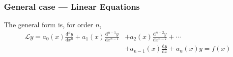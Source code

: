 \documentclass[12pt]{report}
\theoremstyle{definition}
\begin{document}
\subsubsection{General case --- Linear Equations}

The general form is, for order $n$,
\begin{equation}
    \begin{align}\label{ODE:7}
    \mathscr{L} y = a_0(x)\frac{\mathrm{d}^{n}y}{\mathrm{d}x^{n}} + a_1(x)\frac{\mathrm{d}^{n-1}y}{\mathrm{d}x^{n-1}}
    & + a_2(x)\frac{\mathrm{d}^{n-2}y}{\mathrm{d}x^{n-2}} + \cdots \\
    & + a_{n-1}(x)\frac{\mathrm{d}y}{\mathrm{d}x} + a_n(x)y = f(x)
    \end{align}
\end{equation}
    
\end{document}
